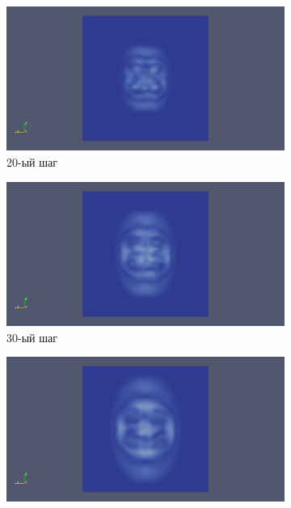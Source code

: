 \begin{figure}[H]
\begin{subfigure}[b]{0.5\textwidth}
\centering
\includegraphics[width=1.0\textwidth]{png/two-layers/slice_20.png}
\caption{20-ый шаг}
\end{subfigure}
\begin{subfigure}[b]{0.5\textwidth}
\centering
\includegraphics[width=1.0\textwidth]{png/two-layers/slice_30.png}
\caption{30-ый шаг}
\end{subfigure}
\begin{subfigure}[b]{0.5\textwidth}
\centering
\includegraphics[width=1.0\textwidth]{png/two-layers/slice_40.png}

\end{subfigure}
\end{figure}
